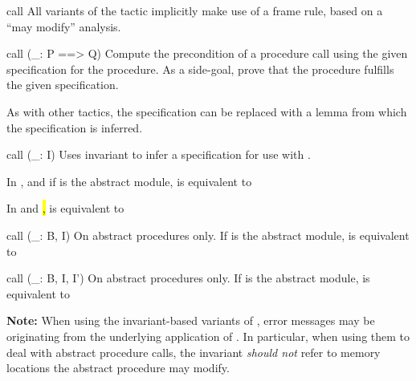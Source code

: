 \begin{tactic}{call}
  All variants of the  tactic implicitly make use of a frame
  rule, based on a ``may modify'' analysis.

  \begin{tsyntax}{call (_: P ==> Q)}
  Compute the precondition of a procedure call using the given
  specification for the procedure. As a side-goal, prove that the
  procedure fulfills the given specification.

  As with other tactics, the specification  can be
  replaced with a lemma from which the specification is inferred.
  \end{tsyntax}

  \begin{tsyntax}{call (_: I)}
  Uses invariant  to infer a specification for use with
  .

  In \prhl, and if  is the abstract module, 
  is equivalent to

  In \phl and \hl,  is equivalent to
  \end{tsyntax}

  \begin{tsyntax}{call (_: B, I)}
  On \prhl abstract procedures only.
  If  is the abstract module,  is equivalent to
  \end{tsyntax}

  \begin{tsyntax}{call (_: B, I, I')}
  On \prhl abstract procedures only.
  If  is the abstract module,  is equivalent to
  \end{tsyntax}

  \textbf{Note:} When using the invariant-based variants of
  , error messages may be originating from the underlying
  application of . In particular, when using them to
  deal with abstract procedure calls, the invariant \emph{should not}
  refer to memory locations the abstract procedure may modify.
\end{tactic}
